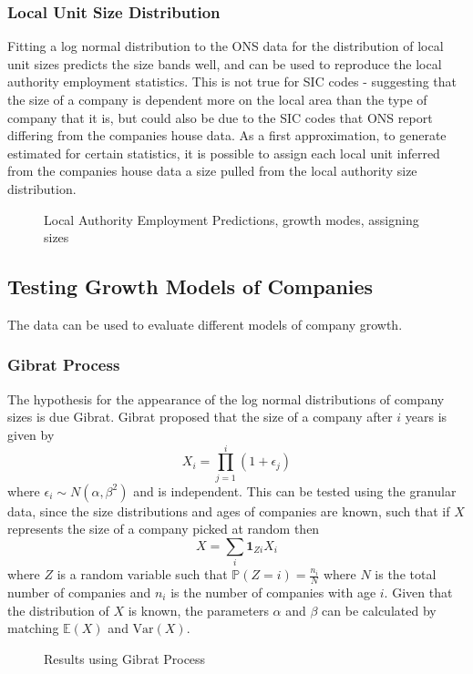 \documentclass[a4paper,10pt]{article}
\begin{document}
\subsubsection{Local Unit Size Distribution}
Fitting a log normal distribution to the ONS data for the distribution of local unit sizes predicts the size bands well, and can be used to reproduce the local authority employment statistics. This is not true for SIC codes - suggesting that the size of a company is dependent more on the local area than the type of company that it is, but could also be due to the SIC codes that ONS report differing from the companies house data. As a first approximation, to generate estimated for certain statistics, it is possible to assign each local unit inferred from the companies house data a size pulled from the local authority size distribution. 
\begin{figure}[!ht]
 \caption{Local Authority Employment Predictions, growth modes, assigning sizes}
 \label{la_employment}
\end{figure}
\subsection{Testing Growth Models of Companies}
The data can be used to evaluate different models of company growth.
\subsubsection{Gibrat Process}
The hypothesis for the appearance of the log normal distributions of company sizes is due Gibrat. Gibrat proposed that the size of a company after $i$ years is given by
\begin{equation}
 X_i = \prod_{j=1}^{i}(1 + \epsilon_j)
\end{equation}
where $\epsilon_i \sim N(\alpha, \beta^2)$ and is independent. This can be tested using the granular data, since the size distributions and ages of companies are known, such that if $X$ represents the size of a company picked at random then
\begin{equation}
 X = \sum_{i}\mathbf{1}_{Zi}X_i
\end{equation}
where $Z$ is a random variable such that $\mathbb{P}(Z = i) = \frac{n_i}{N}$ where $N$ is the total number of companies and $n_i$ is the number of companies with age $i$. Given that the distribution of $X$ is known, the parameters $\alpha$ and $\beta$ can be calculated by matching $\mathbb{E}(X)$ and $\mathrm{Var}(X)$.
\begin{figure}[!ht]
 \caption{Results using Gibrat Process}
 \label{gibrat_local_units}
\end{figure}
\end{document}
